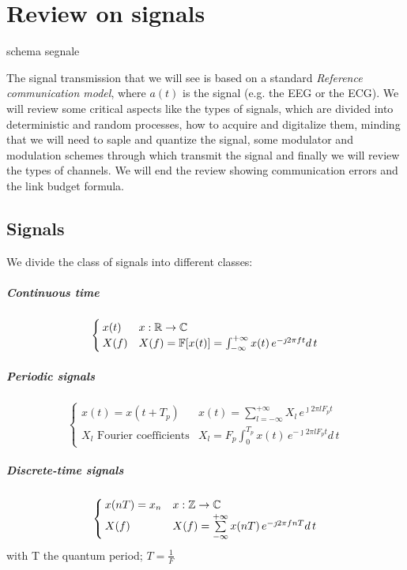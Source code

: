\chapter{Review on signals}
schema segnale

The signal transmission that we will see is based on a standard \emph{Reference communication model}, where $a(t)$ is the signal (e.g. the EEG or the ECG). We will review some critical aspects like the types of signals, which are divided into deterministic and random processes, how to acquire and digitalize them, minding that we will need to saple and quantize the signal, some modulator and modulation schemes through which transmit the signal and finally we will review the types of channels. We will end the review showing communication errors and the link budget formula.

\section{Signals}
We divide the class of signals into different classes:
\paragraph{Continuous time}

\begin{equation}
  \begin{cases}
    x(t) &x: \mathbb{R} \to \mathbb{C}  \\
    X(f) & X(f)  =\mathbb{F}[x(t)] = \int_{-\infty}^{+\infty} x(t) \, e^{-\jmath 2 \pi f t} d\,t
  \end{cases}
\end{equation}

\paragraph{Periodic signals}
\begin{equation}
  \begin{cases}
    x(t) = x(t+T_p) &x(t)=\sum\limits_{l=-\infty}^{+\infty} X_l \, e^{\jmath 2 \pi l F_p t}\\
    X_l \text{ Fourier coefficients} & X_l  =F_p \int_{0}^{T_p} x(t) \, e^{-\jmath 2 \pi l F_p t} d\,t
  \end{cases}
\end{equation}

\paragraph{Discrete-time signals}
\begin{equation}
  \begin{cases}
    x(nT) = x_n &x: \mathbb{Z} \to \mathbb{C}\\
    X(f) & X(f)  = \sum\limits_{-\infty}^{+\infty} x(nT) \, e^{-\jmath 2 \pi f n T} d\,t
  \end{cases}
\end{equation}
with T the quantum period; $T = \frac{1}{F}$

